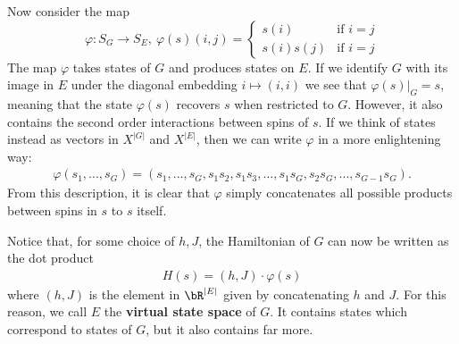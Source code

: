 \documentclass[raggedright, nofonts, notitlepage, openany, debug]{tufte-book}
\begin{document}
Now consider the map
\begin{equation}\label{eqn:virtual-map}
  \varphi:S_G \to S_E, ~\varphi(s)(i,j) = 
  \begin{cases}
    s(i) & \text{if } i = j \\
    s(i)s(j) & \text{if } i = j
  \end{cases}
\end{equation}
The map $\varphi$ takes states of $G$ and produces states on $E$. If we identify $G$ with its image in $E$ under the diagonal embedding $i \mapsto (i,i)$ we see that $\varphi(s)|_{G} = s$, meaning that the state $\varphi(s)$ recovers $s$ when restricted to $G$. However, it also contains the second order interactions between spins of $s$. If we think of states instead as vectors in $X^{|G|}$ and $X^{|E|}$, then we can write $\varphi$ in a more enlightening way:
\begin{align*}
\varphi(s_1,...,s_{G}) = (s_1,...,s_G,s_1s_2,s_1s_3,...,s_1s_G,s_2s_G,...,s_{G-1}s_{G}).
\end{align*}
From this description, it is clear that $\varphi$ simply concatenates all possible products between spins in $s$ to $s$ itself. 

Notice that, for some choice of $h,J$, the Hamiltonian of $G$ can now be written as the dot product
\begin{align*}
  H(s) = (h,J) \cdot \varphi(s)
\end{align*}
where $(h,J)$ is the element in $\bR^{|E|}$ given by concatenating $h$ and $J$. For this reason, we call $E$ the \textbf{virtual state space} of $G$. It contains states which correspond to states of $G$, but it also contains far more.

\newpage


\end{document}
